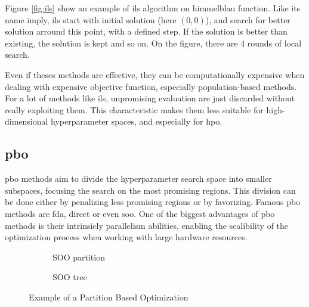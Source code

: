Figure \ref{fig:ils} show an example of \acrshort{ils} algorithm on \gls{himmelblau} function. Like its name imply, \acrfull{ils} start with initial solution (here $(0,0)$), and search for better solution arround this point, with a defined step. If the solution is better than existing, the solution is kept and so on. On the figure, there are 4 rounds of local search.

Even if theses methods are effective, they can be computationally expensive when dealing with expensive objective function, especially population-based methods. For a lot of methods like \acrshort{ils}, unpromising evaluation are just discarded without really exploiting them. This characteristic makes them less suitable for high-dimensional hyperparameter spaces, and especially for \acrshort{hpo}.

\subsection{\acrfull{pbo}} 
\label{sec:pbo}  
 

\acrfull{pbo} methods aim to divide the hyperparameter search space into smaller subspaces, focusing the search on the most promising regions. This division can be done either by penalizing less promising regions or by favorizing. Famous \acrshort{pbo} methods are \acrfull{fda}\cite{nakib_deterministic_2017}, \acrfull{direct} \cite{jones_lipschitzian_1993} or even \acrfull{soo}\cite{munos_optimistic_2011}. One of the biggest advantages of \acrshort{pbo} methods is their intrinsicly parallelism abilities, enabling the scalibility of the optimization process when working with large hardware resources.

\begin{figure}[h]
    \centering
    \begin{subfigure}{.45\linewidth}
      \centering
      
      \caption{SOO partition}
      \label{fig:pbo_partition}
    \end{subfigure}%
    \begin{subfigure}{.45\linewidth}
      \centering
      
      \caption{SOO tree}
      \label{fig:pbo_tree}
    \end{subfigure}
    \caption{Example of a Partition Based Optimization}
    \label{fig:pbo}
\end{figure}

